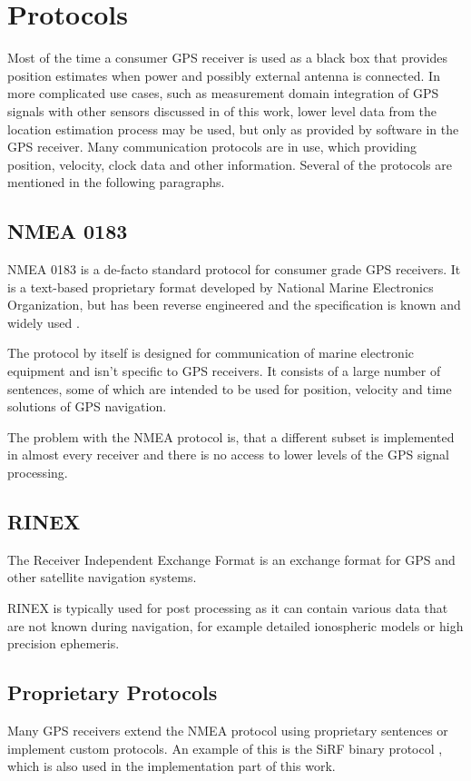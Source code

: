 \section{Protocols}
Most of the time a consumer GPS receiver is used as a black box that provides position
estimates when power and possibly external antenna is connected.
In more complicated use cases, such as measurement domain integration of GPS signals with
other sensors discussed in  of this work,
lower level data from the location estimation process may be used, but only as provided
by software in the GPS receiver.
Many communication protocols are in use, which providing position, velocity, clock data
and other information.
Several of the protocols are mentioned in the following paragraphs.

\subsection{NMEA 0183}
NMEA 0183 is a de-facto standard protocol for consumer grade GPS receivers.
It is a text-based proprietary format developed by National Marine Electronics Organization,
but has been reverse engineered and the specification is known and widely used \cite{depriest}.

The protocol by itself is designed for communication of marine electronic
equipment and isn't specific to GPS receivers.
It consists of a large number of sentences, some of which are intended to be used
for position, velocity and time solutions of GPS navigation.

The problem with the NMEA protocol is, that a different subset is implemented in almost every
receiver and there is no access to lower levels of the GPS signal processing.

\subsection{RINEX}

The Receiver Independent Exchange Format \cite{rinex-format} is an exchange format
for GPS and other satellite navigation systems.

RINEX is typically used for post processing as it can contain various data that are not
known during navigation, for example detailed ionospheric models or high precision ephemeris.

\subsection{Proprietary Protocols}
Many GPS receivers extend the NMEA protocol using proprietary sentences or
implement custom protocols.
An example of this is the SiRF binary protocol \cite{sirf-protocol}, which is also
used in the implementation part of this work.

